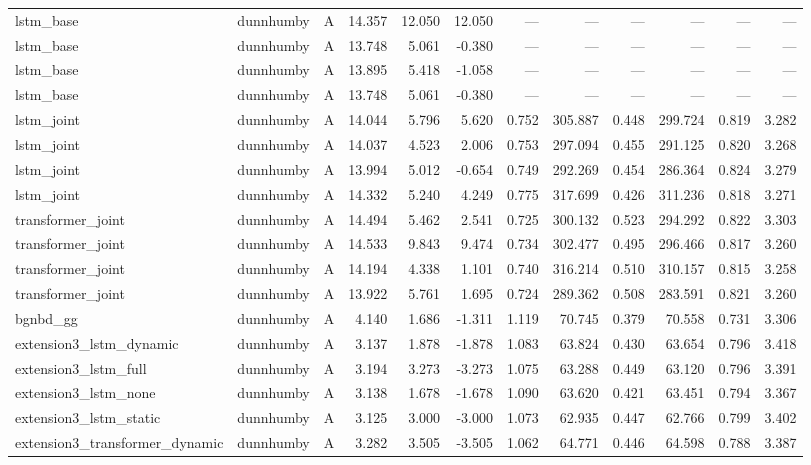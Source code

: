\begin{table}
\begin{tabular}{lllrrrrrrrrr}
lstm_base & dunnhumby & A & 14.357 & 12.050 & 12.050 & — & — & — & — & — & — \\
lstm_base & dunnhumby & A & 13.748 & 5.061 & -0.380 & — & — & — & — & — & — \\
lstm_base & dunnhumby & A & 13.895 & 5.418 & -1.058 & — & — & — & — & — & — \\
lstm_base & dunnhumby & A & 13.748 & 5.061 & -0.380 & — & — & — & — & — & — \\
lstm_joint & dunnhumby & A & 14.044 & 5.796 & 5.620 & 0.752 & 305.887 & 0.448 & 299.724 & 0.819 & 3.282 \\
lstm_joint & dunnhumby & A & 14.037 & 4.523 & 2.006 & 0.753 & 297.094 & 0.455 & 291.125 & 0.820 & 3.268 \\
lstm_joint & dunnhumby & A & 13.994 & 5.012 & -0.654 & 0.749 & 292.269 & 0.454 & 286.364 & 0.824 & 3.279 \\
lstm_joint & dunnhumby & A & 14.332 & 5.240 & 4.249 & 0.775 & 317.699 & 0.426 & 311.236 & 0.818 & 3.271 \\
transformer_joint & dunnhumby & A & 14.494 & 5.462 & 2.541 & 0.725 & 300.132 & 0.523 & 294.292 & 0.822 & 3.303 \\
transformer_joint & dunnhumby & A & 14.533 & 9.843 & 9.474 & 0.734 & 302.477 & 0.495 & 296.466 & 0.817 & 3.260 \\
transformer_joint & dunnhumby & A & 14.194 & 4.338 & 1.101 & 0.740 & 316.214 & 0.510 & 310.157 & 0.815 & 3.258 \\
transformer_joint & dunnhumby & A & 13.922 & 5.761 & 1.695 & 0.724 & 289.362 & 0.508 & 283.591 & 0.821 & 3.260 \\
bgnbd_gg & dunnhumby & A & 4.140 & 1.686 & -1.311 & 1.119 & 70.745 & 0.379 & 70.558 & 0.731 & 3.306 \\
extension3_lstm_dynamic & dunnhumby & A & 3.137 & 1.878 & -1.878 & 1.083 & 63.824 & 0.430 & 63.654 & 0.796 & 3.418 \\
extension3_lstm_full & dunnhumby & A & 3.194 & 3.273 & -3.273 & 1.075 & 63.288 & 0.449 & 63.120 & 0.796 & 3.391 \\
extension3_lstm_none & dunnhumby & A & 3.138 & 1.678 & -1.678 & 1.090 & 63.620 & 0.421 & 63.451 & 0.794 & 3.367 \\
extension3_lstm_static & dunnhumby & A & 3.125 & 3.000 & -3.000 & 1.073 & 62.935 & 0.447 & 62.766 & 0.799 & 3.402 \\
extension3_transformer_dynamic & dunnhumby & A & 3.282 & 3.505 & -3.505 & 1.062 & 64.771 & 0.446 & 64.598 & 0.788 & 3.387 \\

\end{tabular}
\end{table}
